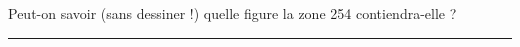 \documentclass[a4paper,gray,11pt]{article}
\begin{document}
{\begin{minipage}{0.5\textwidth}
\begin{enumerate}
			      Peut-on savoir (sans dessiner !) quelle figure la zone 254 contiendra-elle ? \vspace{6em}
		\end{enumerate}
	\end{minipage}
}

\vspace{1em}
\hrule
\vspace{1em}

\end{document}
